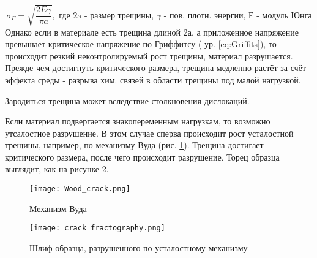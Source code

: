 \begin{equation}
\sigma_{\Gamma} = \sqrt{\frac{2E\gamma}{\pi a}}, \text{ где 2a - размер трещины, $\gamma$ - пов. плотн. энергии, Е - модуль Юнга}
\label{eq:Griffits}  
\end{equation}
Однако если в материале есть трещина длиной 2а, а приложенное напряжение превышает критическое напряжение по Гриффитсу ( ур. \ref{eq:Griffits}), то происходит резкий неконтролируемый рост трещины, материал разрушается. Прежде чем достигнуть критического размера, трещина медленно растёт за счёт эффекта среды - разрыва хим. связей в области трещины под малой нагрузкой. \par 
Зародиться трещина может вследствие столкновения дислокаций. 
\par Если материал подвергается знакопеременным нагрузкам, то возможно утсалостное разрушение. В этом случае сперва происходит рост усталостной трещины, например, по механизму Вуда (рис. \ref{fig:Wood_crack}). Трещина достигает критического размера, после чего происходит разрушение. Торец образца выглядит, как на рисунке \ref{fig:crack_fractography}.
\begin{figure}[h!]
\centering
\texttt{[image: Wood\_crack.png]}\caption{Механизм Вуда} \label{fig:Wood_crack}
\end{figure} 
\begin{figure}[h!]
\centering
\texttt{[image: crack\_fractography.png]}\caption{Шлиф образца, разрушенного по усталостному механизму}\label{fig:crack_fractography}
\end{figure} 
